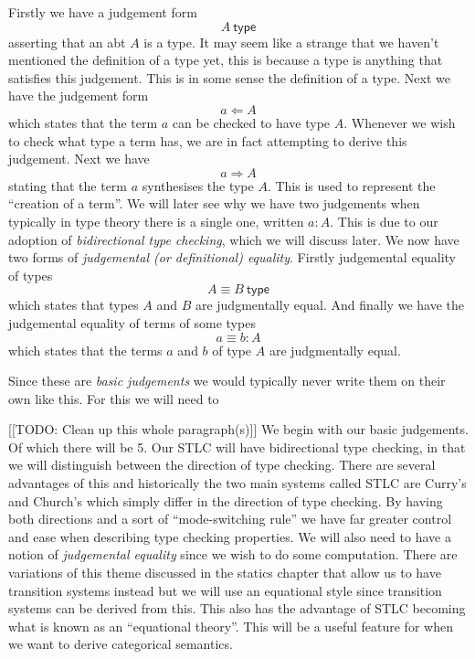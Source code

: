 \begin{defin}
    Firstly we have a judgement form 
    $$A \ \mathsf{type}$$
    asserting that an abt $A$ is a type. It may seem like a strange that we haven't mentioned the definition of a type yet, this is because a type is anything that satisfies this judgement. This is in some sense the definition of a type.
    Next we have the judgement form
    $$a \Leftarrow A$$
    which states that the term $a$ can be checked to have type $A$. Whenever we wish to check what type a term has, we are in fact attempting to derive this judgement.
    Next we have
    $$a \Rightarrow A$$
    stating that the term $a$ synthesises the type $A$. This is used to represent the ``creation of a term''. We will later see why we have two judgements when typically in type theory there is a single one, written $a : A$. This is due to our adoption of \emph{bidirectional type checking}, which we will discuss later.
    We now have two forms of \emph{judgemental (or definitional) equality}. Firstly judgemental equality of types
    $$A \equiv B \ \mathsf{type}$$
    which states that types $A$ and $B$ are judgmentally equal. And finally we have the judgemental equality of terms of some types
    $$a \equiv b : A$$
    which states that the terms $a$ and $b$ of type $A$ are judgmentally equal.
\end{defin}

\begin{remark}
    Since these are \emph{basic judgements} we would typically never write them on their own like this. For this we will need to 
\end{remark}

%
%
[[TODO: Clean up this whole paragraph(s)]]
We begin with our basic judgements. Of which there will be 5. Our STLC will have bidirectional type checking, in that we will distinguish between the direction of type checking. There are several advantages of this and historically the two main systems called STLC are Curry's and Church's which simply differ in the direction of type checking. By having both directions and a sort of ``mode-switching rule'' we have far greater control and ease when describing type checking properties. We will also need to have a notion of \emph{judgemental equality} since we wish to do some computation. There are variations of this theme discussed in the statics chapter that allow us to have transition systems instead but we will use an equational style since transition systems can be derived from this. This also has the advantage of STLC becoming what is known as an ``equational theory''. This will be a useful feature for when we want to derive categorical semantics. 

